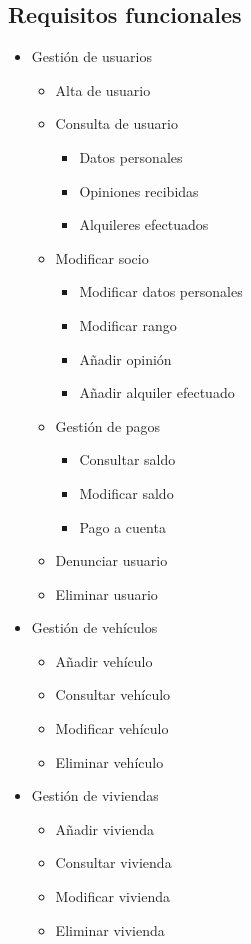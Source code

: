 \documentclass[11pt,spanish]{article} %
\begin{document}
\subsection{Requisitos funcionales}
\begin{itemize}
	\item Gestión de usuarios
	
	\begin{itemize}
		\item Alta de usuario
		\item Consulta de usuario
		\begin{itemize}
			\item Datos personales
			\item Opiniones recibidas
			\item Alquileres efectuados
		\end{itemize}
		\item Modificar socio
		\begin{itemize}
			\item Modificar datos personales
			\item Modificar rango
			\item Añadir opinión
			\item Añadir alquiler efectuado
		\end{itemize}
		\item Gestión de pagos
		\begin{itemize}
			\item Consultar saldo
			\item Modificar saldo
			\item Pago a cuenta
		\end{itemize}
		\item Denunciar usuario
		\item Eliminar usuario
	\end{itemize}
	
	\item Gestión de vehículos
	\begin{itemize}
		\item Añadir vehículo
		\item Consultar vehículo
		\item Modificar vehículo
		\item Eliminar vehículo
	\end{itemize}
	\item Gestión de viviendas
	\begin{itemize}
		\item Añadir vivienda
		\item Consultar vivienda
		\item Modificar vivienda
		\item Eliminar vivienda
	\end{itemize}
	

\end{itemize}
\end{document}
